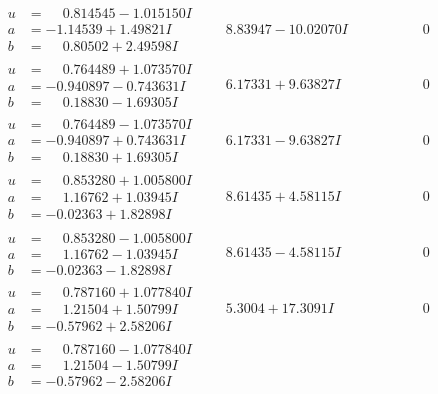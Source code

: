 \documentclass[1p]{elsarticle_modified}
\theoremstyle{definition}
\begin{document}
$$\begin{array}{c|c|c}
\begin{aligned}
u &= \phantom{-}0.814545 - 1.015150 I \\
a &= -1.14539 + 1.49821 I \\
b &= \phantom{-}0.80502 + 2.49598 I\end{aligned}
 & \phantom{-}8.83947 - 10.02070 I & \phantom{-0.000000 } 0 \\ \hline\begin{aligned}
u &= \phantom{-}0.764489 + 1.073570 I \\
a &= -0.940897 - 0.743631 I \\
b &= \phantom{-}0.18830 - 1.69305 I\end{aligned}
 & \phantom{-}6.17331 + 9.63827 I & \phantom{-0.000000 } 0 \\ \hline\begin{aligned}
u &= \phantom{-}0.764489 - 1.073570 I \\
a &= -0.940897 + 0.743631 I \\
b &= \phantom{-}0.18830 + 1.69305 I\end{aligned}
 & \phantom{-}6.17331 - 9.63827 I & \phantom{-0.000000 } 0 \\ \hline\begin{aligned}
u &= \phantom{-}0.853280 + 1.005800 I \\
a &= \phantom{-}1.16762 + 1.03945 I \\
b &= -0.02363 + 1.82898 I\end{aligned}
 & \phantom{-}8.61435 + 4.58115 I & \phantom{-0.000000 } 0 \\ \hline\begin{aligned}
u &= \phantom{-}0.853280 - 1.005800 I \\
a &= \phantom{-}1.16762 - 1.03945 I \\
b &= -0.02363 - 1.82898 I\end{aligned}
 & \phantom{-}8.61435 - 4.58115 I & \phantom{-0.000000 } 0 \\ \hline\begin{aligned}
u &= \phantom{-}0.787160 + 1.077840 I \\
a &= \phantom{-}1.21504 + 1.50799 I \\
b &= -0.57962 + 2.58206 I\end{aligned}
 & \phantom{-}5.3004 + 17.3091 I & \phantom{-0.000000 } 0 \\ \hline\begin{aligned}
u &= \phantom{-}0.787160 - 1.077840 I \\
a &= \phantom{-}1.21504 - 1.50799 I \\
b &= -0.57962 - 2.58206 I\end{aligned}

\end{array}$$
\end{document}
